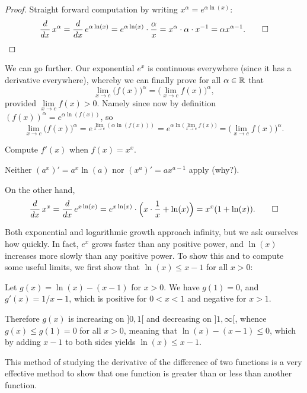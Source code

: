 \begin{proof}
	Straight forward computation by writing $x^\alpha = e^{\alpha \ln(x)}$:
	\[
		\frac{d}{d x} \, x^\alpha = \frac{d}{d x} \, e^{\alpha \ln(x)} = e^{\alpha \ln(x)} \cdot \frac{\alpha}{x} = x^\alpha \cdot \alpha \cdot x^{-1} = \alpha x^{\alpha - 1}.\qedhere
	\]
\end{proof}

\noindent
We can go further.
Our exponential $e^x$ is continuous everywhere (since it has a derivative everywhere), whereby we can finally prove for all $\alpha \in \mathbb{R}$ that
\[
	\lim_{x \to c} \big ( f(x) \big )^\alpha = \Big ( \lim_{x \to c} f(x) \Big )^\alpha,
\]
provided $\lim\limits_{x \to c} f(x) > 0$.
Namely since now by definition $(f(x))^\alpha = e^{\alpha \ln(f(x))}$, so
\[
	\lim_{x \to c} \big ( f(x) \big )^\alpha = e^{\lim\limits_{x \to c} (\alpha \ln(f(x)))} = e^{\alpha \ln \big ( \lim\limits_{x \to c} f(x) \big )} = \Big ( \lim_{x \to c} f(x) \Big )^\alpha.
\]

\begin{example}
	Compute $f'(x)$ when $f(x) = x^x$.

	Neither $(a^x)' = a^x \ln(a)$ nor $(x^a)' = a x^{a - 1}$ apply (why?).

	On the other hand,
	\[
		\frac{d}{d x} \, x^x = \frac{d}{d x} \, e^{x \ln(x)} = e^{x \ln(x)} \cdot \Big ( x \cdot \frac{1}{x} + \ln(x) \Big ) = x^x (1 + \ln(x)). \qedhere
	\]
\end{example}


Both exponential and logarithmic growth approach infinity, but we ask ourselves how quickly.
In fact, $e^x$ grows faster than any positive power, and $\ln(x)$ increases more slowly than any positive power. To show this and to compute some useful limits, we first show that $\ln(x) \leq x - 1$ for all $x > 0$:

Let $g(x) = \ln(x) - (x - 1)$ for $x > 0$.
We have $g(1) = 0$, and $g'(x) = 1/x - 1$, which is positive for $0 < x < 1$ and negative for $x > 1$.

Therefore $g(x)$ is increasing on ${]{0, 1}[}$ and decreasing on ${]{1, \infty}[}$, whence $g(x) \leq g(1) = 0$ for all $x > 0$, meaning that $\ln(x) - (x - 1) \leq 0$, which by adding $x - 1$ to both sides yields $\ln(x) \leq x - 1$.

This method of studying the derivative of the difference of two functions is a very effective method to show that one function is greater than or less than another function.

